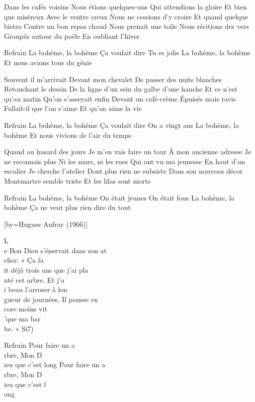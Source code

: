 \beginverse
Dans les cafés voisins
Nous étions quelques-uns
Qui attendions la gloire
Et bien que miséreux
Avec le ventre creux
Nous ne cessions d'y croire
Et quand quelque bistro
Contre un bon repas chaud
Nous prenait une toile
Nous récitions des vers
Groupés autour du poêle
En oubliant l'hiver
\endverse

	Refrain
La bohème, la bohème
Ça voulait dire
Tu es jolie
La bohème, la bohème
Et nous avions tous du génie

\beginverse
Souvent il m'arrivait
Devant mon chevalet
De passer des nuits blanches
Retouchant le dessin
De la ligne d'un sein
du galbe d'une hanche
Et ce n'est qu'au matin
Qu'on s'asseyait enfin
Devant un café-crème
Épuisés mais ravis
Fallait-il que l'on s'aime
Et qu'on aime la vie
\endverse

	Refrain
La bohème, la bohème
Ça voulait dire
On a vingt ans
La bohème, la bohème
Et nous vivions de l'air du temps

\beginverse
Quand au hasard des jours
Je m'en vais faire un tour
À mon ancienne adresse
Je ne reconnais plus
Ni les murs, ni les rues
Qui ont vu ma jeunesse
En haut d'un escalier
Je cherche l'atelier
Dont plus rien ne subsiste
Dans son nouveau décor
Montmartre semble triste
Et les lilas sont morts
\endverse

	Refrain
La bohème, la bohème
On était jeunes
On était fous
La bohème, la bohème
Ça ne veut plus rien dire du tout

[by={Hugues Aufray (1966)}]

\beginverse
L\\[Mi]e Bon Dieu s'énervait dans son at\\[La]elier:
« Ça fa\\[Mi]it déjà trois ans que j'ai pla\\[Si7]nté cet arbre.
Et j'a\\[Mi]i beau l'arroser à lon\\[La]gueur de journées,
Il pousse en\\[Mi]core moins vit\\[Si7]'que ma bar\\[Mi]be. » Si7)
\endverse

	Refrain
Pour faire un a\\[Mi]rbre, Mon D\\[La]ieu que c'est long
Pour faire un a\\[Mi]rbre, Mon D\\[Si7]ieu que c'est l\\[Mi]ong
\\[Bis]

